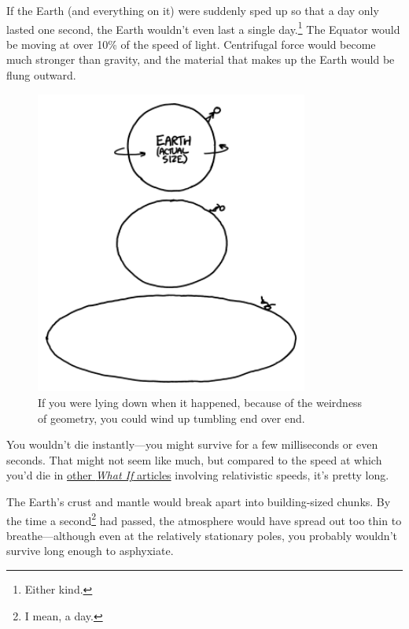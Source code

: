 {{If the Earth (and everything on it) were suddenly sped up so that a day only lasted one second, the Earth wouldn't even last a single day.{\footnote{Either kind.} } The Equator would be moving at over 10\% of the speed of light. Centrifugal force would become much stronger than gravity, and the material that makes up the Earth would be flung outward.}

\begin{figure}[!htbp]
\centering
\includegraphics[scale=0.5, max width=0.8\textwidth]{imgs/a/92/day_apart.png}
\caption{If you were lying down when it happened, because of the weirdness of geometry, you could wind up tumbling end over end.}
\end{figure}

{You wouldn't die instantly—you might survive for a few milliseconds or even seconds. That might not seem like much, but compared to the speed at which you'd die in \href{http://what-if.xkcd.com/1/}{other \emph{What If} articles} involving relativistic speeds, it's pretty long.}

{The Earth's crust and mantle would break apart into building-sized chunks. By the time a second{\footnote{I mean, a day.} } had passed, the atmosphere would have spread out too thin to breathe—although even at the relatively stationary poles, you probably wouldn't survive long enough to asphyxiate.}

}
